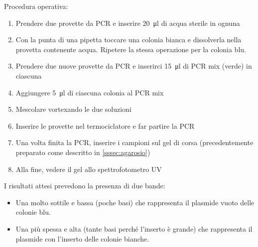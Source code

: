 \noindent Procedura operativa:
\begin{enumerate}
	\item Prendere due provette da PCR e inserire \qty{20}{\micro\litre} di acqua sterile in ognuna
	\item Con la punta di una pipetta toccare una colonia bianca e dissolverla nella provetta contenente acqua. Ripetere la stessa operazione per la colonia blu.
	\item Prendere due nuove provette da PCR e inserirci \qty{15}{\micro\litre} di PCR mix (verde) in ciascuna
	\item Aggiungere \qty{5}{\micro\litre} di ciascuna colonia al PCR mix 
	\item Mescolare vortexando le due soluzioni
	\item Inserire le provette nel termociclatore e far partire la PCR
	\item Una volta finita la PCR, inserire i campioni sul gel di corsa (precedentemente preparato come descritto in \ref{sssec:agarosio})
	\item Alla fine, vedere il gel allo spettrofotometro UV
\end{enumerate}

\noindent I risultati attesi prevedono la presenza di due bande:
\begin{itemize}
	\item Una molto sottile e bassa (poche basi) che rappresenta il plasmide vuoto delle colonie blu.
	\item Una più spessa e alta (tante basi perché l’inserto è grande) che rappresenta il plasmide con l’inserto delle colonie bianche.
\end{itemize}